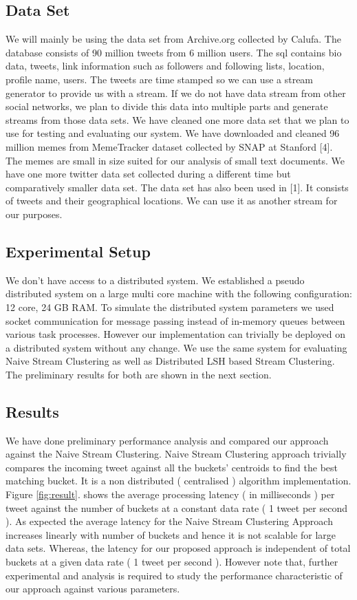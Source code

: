 \documentclass{article} %
\begin{document}
\subsection{Data Set}
We will mainly be using the data set from Archive.org collected by Calufa. The database consists of 90 million tweets from 6 million users. The sql contains bio data, tweets, link information such as followers and following lists, location, profile name, users. The tweets are time stamped so we can use a stream generator to provide us with a stream. If we do not have data stream from other social networks, we plan to divide this data into multiple parts and generate streams from those data sets.
We have cleaned one more data set that we plan to use for testing and evaluating our system. We have downloaded and cleaned 96 million memes from MemeTracker dataset collected by SNAP at Stanford [4]. The memes are small in size suited for our analysis of small text documents.
We have one more twitter data set collected during a different time but comparatively smaller data set. The data set has also been used in [1]. It consists of tweets and their geographical locations. We can use it as another stream for our purposes.

\subsection{Experimental Setup}
We don't have access to a distributed system. We established a pseudo distributed system on a large multi core machine with the following configuration: 12 core, 24 GB RAM. To simulate the distributed system parameters we used socket communication for message passing instead of in-memory queues between various task processes. However our implementation can trivially be deployed on a distributed system without any change. We use the same system for evaluating Naive Stream Clustering as well as Distributed LSH based Stream Clustering. The preliminary results for both are shown in the next section.


\subsection{Results}
We have done preliminary performance analysis and compared our approach against the Naive Stream Clustering. Naive Stream Clustering approach trivially compares the incoming tweet against all the buckets' centroids to find the best matching bucket. It is a non distributed ( centralised ) algorithm implementation. Figure \ref{fig:result}. shows the average processing latency ( in milliseconds ) per tweet against the number of buckets at a constant data rate ( 1 tweet per second ). As expected the average latency for the Naive Stream Clustering Approach increases linearly with number of buckets and hence it is not scalable for large data sets. Whereas, the latency for our proposed approach is independent of total buckets at a given data rate ( 1 tweet per second ).
However note that, further experimental and analysis is required to study the performance characteristic of our approach against various parameters.
\end{document}
